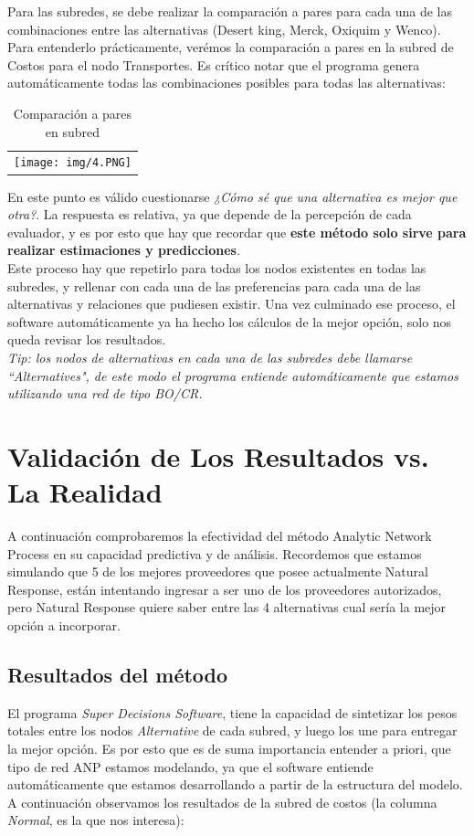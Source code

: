\documentclass[12pt,twocolumn]{article}
\begin{document}
\newpage
Para las subredes, se debe realizar la comparación a pares para cada una de las combinaciones entre las alternativas (Desert king, Merck, Oxiquim y Wenco). Para entenderlo prácticamente, verémos la comparación a pares en la subred de Costos para el nodo Transportes. Es crítico notar que el programa genera automáticamente todas las combinaciones posibles para todas las alternativas:

\begin{table}[h]
\centering
\begin{tabular}{c}
\texttt{[image: img/4.PNG]}
\end{tabular}
\caption{Comparación a pares en subred}
\label{tab:comparacion a pares}
\end{table}

En este punto es válido cuestionarse \textit{¿Cómo sé que una alternativa es mejor que otra?}. La respuesta es relativa, ya que depende de la percepción de cada evaluador, y es por esto que hay que recordar que \textbf{este método solo sirve para realizar estimaciones y predicciones}.\\

Este proceso hay que repetirlo para todas los nodos existentes en todas las subredes, y rellenar con cada una de las preferencias para cada una de las alternativas y relaciones que pudiesen existir. Una vez culminado ese proceso, el software automáticamente ya ha hecho los cálculos de la mejor opción, solo nos queda revisar los resultados.\\

\textit{Tip: los nodos de alternativas en cada una de las subredes debe llamarse ``Alternatives", de este modo el programa entiende automáticamente que estamos utilizando una red de tipo BO/CR.}

\newpage
\section{Validación de Los Resultados vs. La Realidad}
A continuación comprobaremos la efectividad del método Analytic Network Process en su capacidad predictiva y de análisis. Recordemos que estamos simulando que 5 de los mejores proveedores que posee actualmente Natural Response, están intentando ingresar a ser uno de los proveedores autorizados, pero Natural Response quiere saber entre las 4 alternativas cual sería la mejor opción a incorporar.

\subsection{Resultados del método}
El programa \textit{Super Decisions Software}, tiene la capacidad de sintetizar los pesos totales entre los nodos \textit{Alternative} de cada subred, y luego los une para entregar la mejor opción. Es por esto que es de suma importancia entender a priori, que tipo de red ANP estamos modelando, ya que el software entiende automáticamente que estamos desarrollando a partir de la estructura del modelo.\\
A continuación observamos los resultados de la subred de costos (la columna \textit{Normal}, es la que nos interesa):
\end{document}
